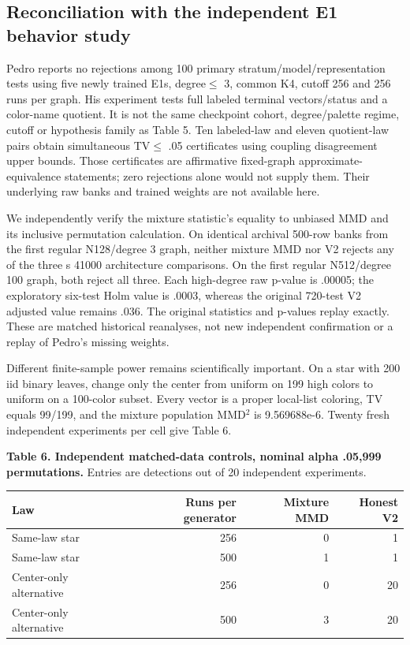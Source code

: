 \documentclass[
  11pt,
]{article}
\newcounter{none} %
\begin{document}
\subsection{Reconciliation with the independent E1 behavior
study}\label{reconciliation-with-the-independent-e1-behavior-study}

Pedro reports no rejections among 100 primary
stratum/model/representation tests using five newly trained E1s,
degree\(\le\) 3, common K4, cutoff 256 and 256 runs per graph. His
experiment tests full labeled terminal vectors/status and a color-name
quotient. It is not the same checkpoint cohort, degree/palette regime,
cutoff or hypothesis family as Table 5. Ten labeled-law and eleven
quotient-law pairs obtain simultaneous TV\(\le\) .05 certificates using
coupling disagreement upper bounds. Those certificates are affirmative
fixed-graph approximate-equivalence statements; zero rejections alone
would not supply them. Their underlying raw banks and trained weights
are not available here.

We independently verify the mixture statistic's equality to unbiased MMD
and its inclusive permutation calculation. On identical archival 500-row
banks from the first regular N128/degree 3 graph, neither mixture MMD
nor V2 rejects any of the three s 41000 architecture comparisons. On the
first regular N512/degree 100 graph, both reject all three. Each
high-degree raw p-value is .00005; the exploratory six-test Holm value
is .0003, whereas the original 720-test V2 adjusted value remains .036.
The original statistics and p-values replay exactly. These are matched
historical reanalyses, not new independent confirmation or a replay of
Pedro's missing weights.

Different finite-sample power remains scientifically important. On a
star with 200 iid binary leaves, change only the center from uniform on
199 high colors to uniform on a 100-color subset. Every vector is a
proper local-list coloring, TV equals 99/199, and the mixture population
MMD\(^2\) is 9.569688e-6. Twenty fresh independent experiments per cell
give Table 6.

\textbf{Table 6. Independent matched-data controls, nominal alpha
.05,999 permutations.} Entries are detections out of 20 independent
experiments.

{\def\LTcaptype{none} %
\begin{longtable}[]{@{}lrrr@{}}
\toprule\noalign{}
Law & Runs per generator & Mixture MMD & Honest V2 \\
\midrule\noalign{}
\endhead
\bottomrule\noalign{}
\endlastfoot
Same-law star & 256 & 0 & 1 \\
Same-law star & 500 & 1 & 1 \\
Center-only alternative & 256 & 0 & 20 \\
Center-only alternative & 500 & 3 & 20 \\
\end{longtable}
}
\end{document}
